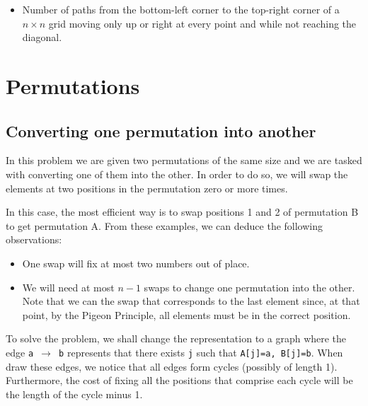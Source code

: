 \begin{itemize}
			\begin{figure}[h!]
					\centering
			\end{figure}

	\item Number of paths from the bottom-left corner to the top-right corner
			of a $n\times n$ grid moving only up or right at every point and
			while not reaching the diagonal.
			\begin{figure}[h!]
					\centering
			\end{figure}
			
\end{itemize}
\newpage
\section{Permutations}
\subsection{Converting one permutation into another }
In this problem we are given two permutations of the same size 
and we are tasked with converting one of them into the other. 
In order to do so, we will swap the elements at two positions
in the permutation zero or more times. 

\begin{figure}[h!]
\centering
{}

\end{figure}
In this case, the most efficient way is to swap positions 1 and 2 
of permutation B to get permutation A. From these examples, we can 
deduce the following observations:
\begin{itemize}
		\item One swap will fix at most two numbers out of
				place.
		\item We will need at most $n-1$ swaps to change one
				permutation into the other. Note that
				we can  the swap that corresponds
				to the last element since, at that point, by
				the Pigeon Principle, all elements must be in 
				the correct position.
\end{itemize}

To solve the problem, we shall change the representation 
to a graph where the edge \texttt{a \nolinebreak$\rightarrow$ \nolinebreak b} 
represents that there exists \texttt{j} such that \texttt{A[j]=a, B[j]=b}.
When draw these edges, we notice that all edges form cycles (possibly of 
length 1).
Furthermore, the cost of fixing all the positions that comprise each
cycle will be the length of the cycle  minus 1.

